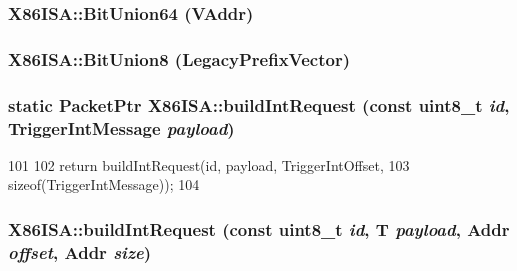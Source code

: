 \label{namespaceX86ISA_ae28542c612a17a0204a7280bf2f19445}
\hypertarget{namespaceX86ISA_afe8a46f6c035b6b4692b3b13071e48b4}{
\subsubsection[{BitUnion64}]{\setlength{\rightskip}{0pt plus 5cm}X86ISA::BitUnion64 (VAddr)}}
\label{namespaceX86ISA_afe8a46f6c035b6b4692b3b13071e48b4}
\hypertarget{namespaceX86ISA_ad30679aa4800b378176d7d464eb5df97}{
\subsubsection[{BitUnion8}]{\setlength{\rightskip}{0pt plus 5cm}X86ISA::BitUnion8 (LegacyPrefixVector)}}
\label{namespaceX86ISA_ad30679aa4800b378176d7d464eb5df97}
\hypertarget{namespaceX86ISA_a115b5aa6b868f3e950a574ff86996013}{
\subsubsection[{buildIntRequest}]{\setlength{\rightskip}{0pt plus 5cm}static {\bf PacketPtr} X86ISA::buildIntRequest (const uint8\_\-t {\em id}, \/  TriggerIntMessage {\em payload})}}
\label{namespaceX86ISA_a115b5aa6b868f3e950a574ff86996013}



\begin{DoxyCode}
101     {
102         return buildIntRequest(id, payload, TriggerIntOffset,
103                 sizeof(TriggerIntMessage));
104     }
\end{DoxyCode}
\hypertarget{namespaceX86ISA_a46d6b5d34e25b133b7dc83e7c21eb546}{
\subsubsection[{buildIntRequest}]{ X86ISA::buildIntRequest (const uint8\_\-t {\em id}, \/  T {\em payload}, \/  {\bf Addr} {\em offset}, \/  {\bf Addr} {\em size})}}
\label{namespaceX86ISA_a46d6b5d34e25b133b7dc83e7c21eb546}



